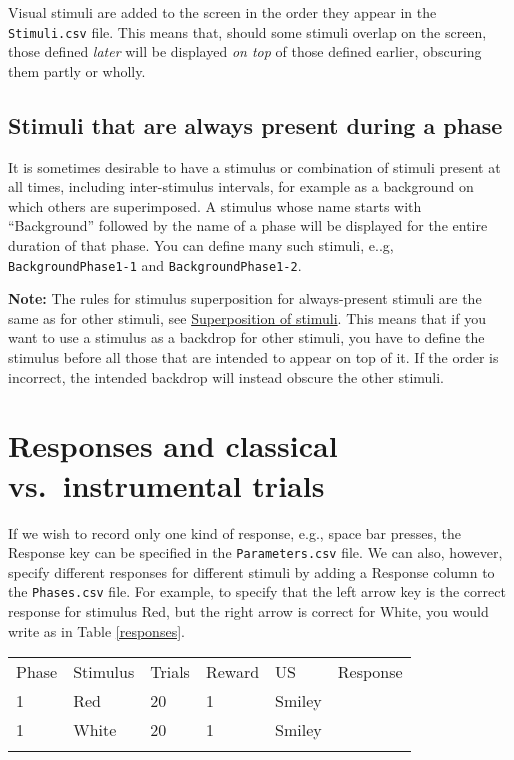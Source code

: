 \documentclass[11pt,]{article}
\renewcommand{\medskip}{}
\begin{document}
Visual stimuli are added to the screen in the order they appear in the
\texttt{Stimuli.csv} file. This means that, should some stimuli overlap
on the screen, those defined \emph{later} will be displayed \emph{on
top} of those defined earlier, obscuring them partly or wholly.

\subsection{Stimuli that are always present during a phase}

It is sometimes desirable to have a stimulus or combination of stimuli
present at all times, including inter-stimulus intervals, for example as
a background on which others are superimposed. A stimulus whose name
starts with ``Background'' followed by the name of a phase will be
displayed for the entire duration of that phase. You can define many
such stimuli, e..g, \texttt{BackgroundPhase1-1} and
\texttt{BackgroundPhase1-2}.

\textbf{Note:} The rules for stimulus superposition for always-present
stimuli are the same as for other stimuli, see
\hyperref[stimulus-superposition]{Superposition of stimuli}. This means
that if you want to use a stimulus as a backdrop for other stimuli, you
have to define the stimulus before all those that are intended to appear
on top of it. If the order is incorrect, the intended backdrop will
instead obscure the other stimuli.

\section{Responses and classical vs.~instrumental trials}

If we wish to record only one kind of response, e.g., space bar presses,
the Response key can be specified in the \texttt{Parameters.csv} file.
We can also, however, specify different responses for different stimuli
by adding a Response column to the \texttt{Phases.csv} file. For
example, to specify that the left arrow key is the correct response for
stimulus Red, but the right arrow is correct for White, you would write
as in Table \ref{responses}.

\begin{table*}[t]\begin{center}\small\begin{tabular}{@{}llllll@{}}
\hline\noalign{\medskip}
Phase & Stimulus & Trials & Reward & US & Response
\\\noalign{\medskip}
\hline\noalign{\medskip}
1 & Red & 20 & 1 & Smiley &
\\\noalign{\medskip}
1 & White & 20 & 1 & Smiley &
\\\noalign{\medskip}
\hline
\noalign{\medskip}
\end{tabular}\caption{A \texttt{Phases.csv} specifying different responses for
stimuli Red and White. \label{responses}}
\end{center}\end{table*}
\end{document}
